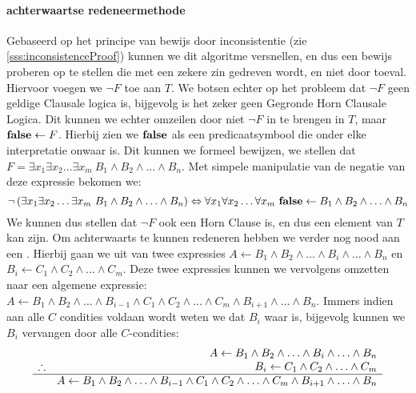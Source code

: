 \paragraph{achterwaartse redeneermethode}Gebaseerd op het principe van bewijs door inconsistentie (zie \ref{sss:inconsistenceProof}) kunnen we dit algoritme versnellen, en dus een bewijs proberen op te stellen die met een zekere zin gedreven wordt, en niet door toeval. Hiervoor voegen we $\neg F$ toe aan $T$. We botsen echter op het probleem dat $\neg F$ geen geldige Clausale logica is, bijgevolg is het zeker geen Gegronde Horn Clausale Logica. Dit kunnen we echter omzeilen door niet $\neg F$ in te brengen in $T$, maar $\mbox{\bf false}\leftarrow F$. Hierbij zien we $\mbox{\bf false}$ als een predicaatsymbool die onder elke interpretatie onwaar is. Dit kunnen we formeel bewijzen, we stellen dat $F=\exists x_1\exists x_2\ldots\exists x_m\ B_1\wedge B_2\wedge\ldots\wedge B_n$. Met simpele manipulatie van de negatie van deze expressie bekomen we:
\begin{equation}
\neg\left(\exists x_1\exists x_2\ldots\exists x_m\ B_1\wedge B_2\wedge\ldots\wedge B_n\right)\Leftrightarrow\forall x_1\forall x_2\ldots\forall x_m\ \false\leftarrow B_1\wedge B_2\wedge\ldots\wedge B_n
\end{equation}
We kunnen dus stellen dat $\neg F$ ook een Horn Clause is, en dus een element van $T$ kan zijn. Om achterwaarts te kunnen redeneren hebben we verder nog nood aan een . Hierbij gaan we uit van twee expressies $A\leftarrow B_1\wedge B_2\wedge\ldots\wedge B_i\wedge\ldots\wedge B_n$ en $B_i\leftarrow C_1\wedge C_2\wedge\ldots\wedge C_m$. Deze twee expressies kunnen we vervolgens omzetten naar een algemene expressie: $A\leftarrow B_1\wedge B_2\wedge\ldots\wedge B_{i-1}\wedge C_1\wedge C_2\wedge\ldots\wedge C_m\wedge B_{i+1}\wedge\ldots\wedge B_n$. Immers indien aan alle $C$ condities voldaan wordt weten we dat $B_i$ waar is, bijgevolg kunnen we $B_i$ vervangen door alle $C$-condities:
\begin{equation}
\begin{array}{lr}
&A\leftarrow B_1\wedge B_2\wedge\ldots\wedge B_i\wedge\ldots\wedge B_n\\
\therefore&B_i\leftarrow C_1\wedge C_2\wedge\ldots\wedge C_m\\
\hline
&A\leftarrow B_1\wedge B_2\wedge\ldots\wedge B_{i-1}\wedge C_1\wedge C_2\wedge\ldots\wedge C_m\wedge B_{i+1}\wedge\ldots\wedge B_n
\end{array}
\label{eqn:furtherGeneralModusPonens}
\end{equation}
